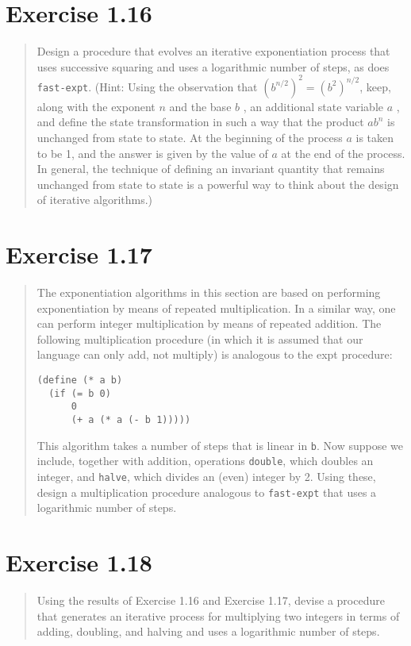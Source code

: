 \documentclass{article}
\begin{document}
\section{Exercise 1.16}
\begin{quote}
	Design a procedure that evolves an iterative exponentiation process that
	uses successive squaring and uses a logarithmic number of steps, as does
	\texttt{fast-expt}. (Hint: Using the observation that
	$(b^{n/2})^2=(b^2)^{n/2}$, keep, along with the exponent $n$ and the base
	$b$ , an additional state variable $a$ , and define the state transformation
	in such a way that the product $ab^n$ is unchanged from state to state. At
	the beginning of the process $a$ is taken to be 1, and the answer is given
	by the value of $a$ at the end of the process. In general, the technique of
	defining an invariant quantity that remains unchanged from state to state
	is a powerful way to think about the design of iterative algorithms.)
\end{quote}



\section{Exercise 1.17}
\begin{quote}
    The exponentiation algorithms in this section are based on performing
    exponentiation by means of repeated multiplication. In a similar way, one
    can perform integer multiplication by means of repeated addition. The
    following multiplication procedure (in which it is assumed that our
    language can only add, not multiply) is analogous to the expt procedure:
    \begin{lstlisting}
(define (* a b)
  (if (= b 0)
      0
      (+ a (* a (- b 1)))))
    \end{lstlisting}
    This algorithm takes a number of steps that is linear in \texttt{b}. Now
    suppose we include, together with addition, operations \texttt{double},
    which doubles an integer, and \texttt{halve}, which divides an (even)
    integer by 2. Using these, design a multiplication procedure analogous to
    \texttt{fast-expt} that uses a logarithmic number of steps.
\end{quote}



\section{Exercise 1.18}
\begin{quote}
    Using the results of Exercise 1.16 and Exercise 1.17, devise a procedure
    that generates an iterative process for multiplying two integers in terms
    of adding, doubling, and halving and uses a logarithmic number of steps.
\end{quote}
\end{document}
